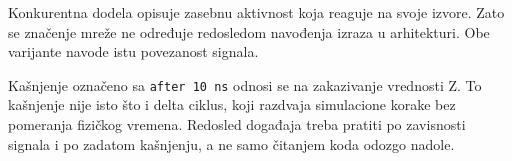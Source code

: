 Konkurentna dodela opisuje zasebnu aktivnost koja reaguje na svoje izvore. Zato se značenje mreže ne određuje redosledom navođenja izraza u arhitekturi. Obe varijante navode istu povezanost signala.

Kašnjenje označeno sa \texttt{after 10 ns} odnosi se na zakazivanje vrednosti Z. To kašnjenje nije isto što i delta ciklus, koji razdvaja simulacione korake bez pomeranja fizičkog vremena. Redosled događaja treba pratiti po zavisnosti signala i po zadatom kašnjenju, a ne samo čitanjem koda odozgo nadole.
